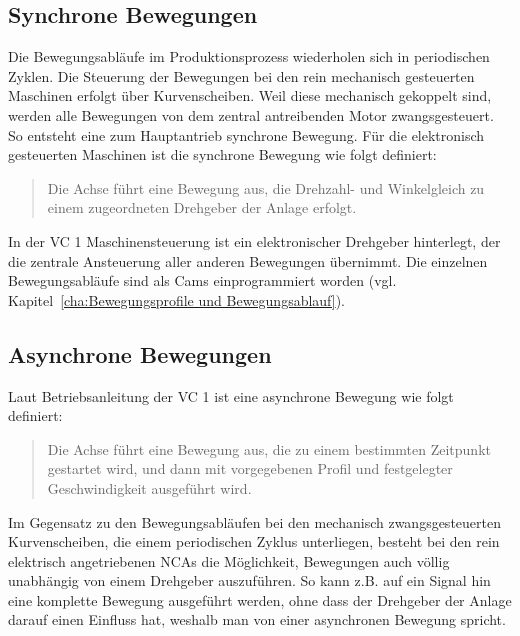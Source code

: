 \subsection{Synchrone Bewegungen}

Die Bewegungsabläufe im Produktionsprozess wiederholen sich in periodischen Zyklen. Die Steuerung der Bewegungen bei den rein mechanisch gesteuerten Maschinen erfolgt über Kurvenscheiben. Weil diese mechanisch gekoppelt sind, werden alle Bewegungen von dem zentral antreibenden Motor zwangsgesteuert. So entsteht eine zum Hauptantrieb synchrone Bewegung. Für die elektronisch gesteuerten Maschinen ist die synchrone Bewegung wie folgt definiert:

\blockquote{Die Achse führt eine Bewegung aus, die Drehzahl- und Winkelgleich zu einem zugeordneten Drehgeber der Anlage erfolgt.} \cite{OttoBihlerMaschinenfabrikGmbH&Co.KG2015}

In der VC 1 Maschinensteuerung ist ein elektronischer Drehgeber hinterlegt, der die zentrale Ansteuerung aller anderen Bewegungen übernimmt. Die einzelnen Bewegungsabläufe sind als Cams einprogrammiert worden (vgl. Kapitel~\ref{cha:Bewegungsprofile und Bewegungsablauf}).











\subsection{Asynchrone Bewegungen}\label{cha:Asynchrone_Bewegung}

Laut Betriebsanleitung der VC 1 ist eine asynchrone Bewegung wie folgt definiert:

\blockquote{Die Achse führt eine Bewegung aus, die zu einem bestimmten Zeitpunkt gestartet wird, und dann mit vorgegebenen Profil und festgelegter Geschwindigkeit ausgeführt wird.} \cite{OttoBihlerMaschinenfabrikGmbH&Co.KG2015}

Im Gegensatz zu den Bewegungsabläufen bei den mechanisch zwangsgesteuerten Kurvenscheiben, die einem periodischen Zyklus unterliegen, besteht bei den rein elektrisch angetriebenen NCAs die Möglichkeit, Bewegungen auch völlig unabhängig von einem Drehgeber auszuführen. So kann z.B. auf ein Signal hin eine komplette Bewegung ausgeführt werden, ohne dass der Drehgeber der Anlage darauf einen Einfluss hat, weshalb man von einer asynchronen Bewegung spricht.



